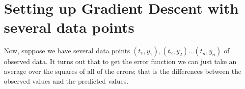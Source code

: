 \documentclass[11pt]{article}
\begin{document}
\newpage
\section*{Setting up Gradient Descent with several data points}
Now, suppose we have several data points $(t_1,y_1), (t_2,y_2) \ldots (t_{n},y_{n})$ of observed data.
It turns out that to get the error function we can just take an average over the squares of all of the errors; that is the differences between the observed values and the predicted values.
\vspace{1cm}

\end{document}
